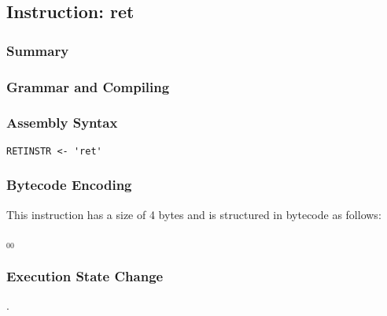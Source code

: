 \subsection{Instruction: ret}

\subsubsection{Summary}


\subsubsection{Grammar and Compiling}


\subsubsection{Assembly Syntax}

\begin{myquote}
\begin{verbatim}
RETINSTR <- 'ret'
\end{verbatim}
\end{myquote}


\subsubsection{Bytecode Encoding}

This instruction has a size of 4 bytes and is structured in bytecode as follows:

$_{00}$\ 


\subsubsection{Execution State Change}

.


